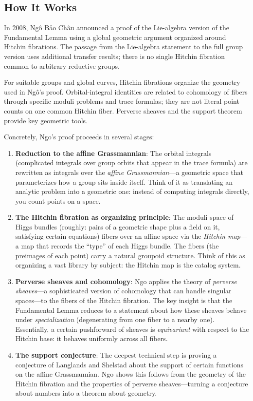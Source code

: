 \subsection{How It Works}

In 2008, Ngô Bảo Châu announced a proof of the Lie-algebra version of the Fundamental Lemma using a global geometric argument organized around Hitchin fibrations. The passage from the Lie-algebra statement to the full group version uses additional transfer results; there is no single Hitchin fibration common to arbitrary reductive groups.

For suitable groups and global curves, Hitchin fibrations organize the geometry used in Ngô's proof. Orbital-integral identities are related to cohomology of fibers through specific moduli problems and trace formulas; they are not literal point counts on one common Hitchin fiber. Perverse sheaves and the support theorem provide key geometric tools.

Concretely, Ngo's proof proceeds in several stages:

\begin{enumerate}
\item \textbf{Reduction to the affine Grassmannian}: The orbital integrals (complicated integrals over group orbits that appear in the trace formula) are rewritten as integrals over the \emph{affine Grassmannian}---a geometric space that parameterizes how a group sits inside itself. Think of it as translating an analytic problem into a geometric one: instead of computing integrals directly, you count points on a space.
\item \textbf{The Hitchin fibration as organizing principle}: The moduli space of Higgs bundles (roughly: pairs of a geometric shape plus a field on it, satisfying certain equations) fibers over an affine space via the \emph{Hitchin map}---a map that records the ``type'' of each Higgs bundle. The fibers (the preimages of each point) carry a natural groupoid structure. Think of this as organizing a vast library by subject: the Hitchin map is the catalog system.
\item \textbf{Perverse sheaves and cohomology}: Ngo applies the theory of \emph{perverse sheaves}---a sophisticated version of cohomology that can handle singular spaces---to the fibers of the Hitchin fibration. The key insight is that the Fundamental Lemma reduces to a statement about how these sheaves behave under \emph{specialization} (degenerating from one fiber to a nearby one). Essentially, a certain pushforward of sheaves is \emph{equivariant} with respect to the Hitchin base: it behaves uniformly across all fibers.
\item \textbf{The support conjecture}: The deepest technical step is proving a conjecture of Langlands and Shelstad about the support of certain functions on the affine Grassmannian. Ngo shows this follows from the geometry of the Hitchin fibration and the properties of perverse sheaves---turning a conjecture about numbers into a theorem about geometry.
\end{enumerate}

